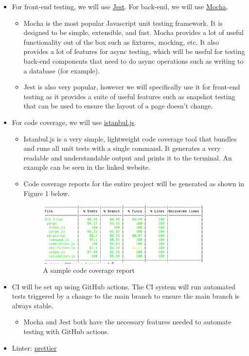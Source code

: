 \documentclass[12pt, titlepage]{article}
\begin{document}
\begin{itemize}
\item For front-end testing, we will use \href{https://jestjs.io/}{Jest}. For back-end, we will use \href{https://mochajs.org/}{Mocha}.
\begin{itemize}
    \item Mocha is the most popular Javascript unit testing framework. It is designed to be simple, extensible, and fast. Mocha provides a lot of useful functionality out of the box such as fixtures, mocking, etc. It also provides a lot of features for async testing, which will be useful for testing back-end components that need to do async operations such as writing to a database (for example). 
    
    \item Jest is also very popular, however we will specifically use it for front-end testing as it provides a suite of useful features such as snapshot testing that can be used to ensure the layout of a page doesn't change.
\end{itemize}

\item For code coverage, we will use \href{https://istanbul.js.org/}{istanbul.js}.
\begin{itemize}
    \item Istanbul.js is a very simple, lightweight code coverage tool that bundles and runs all unit tests with a single command. It generates a very readable and understandable output and prints it to the terminal. An example can be seen in the linked website. 
    \item Code coverage reports for the entire project will be generated as shown in Figure 1 below. \\
    \begin{figure}[H]
    \includegraphics[width=0.9\textwidth]{CodeCoverage}
    \caption{A sample code coverage report}
    \end{figure}
\end{itemize}
\item CI will be set up using GitHub actions. The CI system will run automated tests triggered by a change to the main branch to ensure the main branch is always stable.
\begin{itemize}
    \item Mocha and Jest both have the necessary features needed to automate testing with GitHub actions.
\end{itemize}

\item Linter: \href{https://prettier.io/}{prettier}
\end{itemize}
\end{document}
